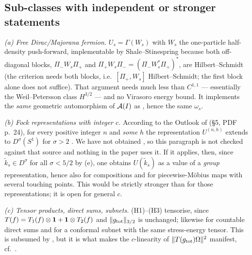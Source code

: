 \subsection{Sub-classes with independent or stronger statements}

\emph{(a) Free Dirac/Majorana fermion.}  $U_{s}=\Gamma(W_{s})$ with $W_{s}$ the one-particle half-density
push-forward, implementable by Shale--Stinespring \cite{SS} because both off-diagonal blocks, $\Pi_{-}W_{s}\Pi_{+}$ and $\Pi_{+}W_{s}\Pi_{-}=(\Pi_{-}W_{s}^{*}\Pi_{+})^{*}$, are
Hilbert--Schmidt \cite{RigorUB} (the criterion needs both blocks, i.e.\ $[\Pi_{+},W_{s}]$ Hilbert--Schmidt; the first block alone does not suffice).  That argument needs much less than $C^{1,1}$ --- essentially the
Weil--Petersson class $H^{3/2}$ --- and no Virasoro energy bound.  It implements the \emph{same} geometric
automorphism of $\mathcal A(I)$ as , hence the same $\omega_{s}$.

\emph{(b) Fock representations with integer $c$.}  According to the Outlook of \cite{CDIT} (\S5, PDF p.~24),
for every positive integer $n$ and \emph{some} $h$ the representation $U^{(n,h)}$ extends to $D^{\sigma}(S^{1})$
for $\sigma>2$ \cite{DIT}.  We have not obtained \cite{DIT}, so this paragraph is not checked against that
source and nothing in the paper uses it.  If it applies, then, since $\tilde k_{s}\in D^{\sigma}$ for all
$\sigma<5/2$ by (e), one obtains $U(\tilde k_{s})$ as a value of a \emph{group}
representation, hence also for compositions and for piecewise-M\"obius maps with several touching points.
This would be strictly stronger than  for those representations; it is open for general $c$.

\emph{(c) Tensor products, direct sums, subnets.}  (H1)--(H3) tensorise, since
$T(f)=T_{1}(f)\otimes\mathbf 1+\mathbf 1\otimes T_{2}(f)$ and $\|g_{\rm tot}\|_{3/2}$ is unchanged; likewise for
countable direct sums and for a conformal subnet with the same stress-energy tensor.  This is subsumed by
, but it is what makes the $c$-linearity of $\|T(g_{\rm tot})\Omega\|^{2}$ manifest, cf.\
.
